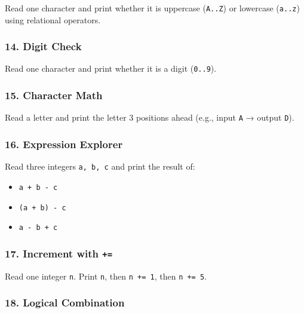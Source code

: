 \documentclass[
  letterpaper,
  DIV=11,
  numbers=noendperiod]{scrreprt}
\providecommand{\tightlist}{%
  \setlength{\itemsep}{0pt}\setlength{\parskip}{0pt}}
\begin{document}
Read one character and print whether it is uppercase
(\texttt{\textquotesingle{}A\textquotesingle{}..\textquotesingle{}Z\textquotesingle{}})
or lowercase
(\texttt{\textquotesingle{}a\textquotesingle{}..\textquotesingle{}z\textquotesingle{}})
using relational operators.

\subsubsection{14. Digit Check}\label{digit-check}

Read one character and print whether it is a digit
(\texttt{\textquotesingle{}0\textquotesingle{}..\textquotesingle{}9\textquotesingle{}}).

\subsubsection{15. Character Math}\label{character-math}

Read a letter and print the letter 3 positions ahead (e.g., input
\texttt{A} → output \texttt{D}).

\subsubsection{16. Expression Explorer}\label{expression-explorer}

Read three integers \texttt{a,\ b,\ c} and print the result of:

\begin{itemize}
\tightlist
\item
  \texttt{a\ +\ b\ -\ c}
\item
  \texttt{(a\ +\ b)\ -\ c}
\item
  \texttt{a\ -\ b\ +\ c}
\end{itemize}

\subsubsection{\texorpdfstring{17. Increment with
\texttt{+=}}{17. Increment with +=}}\label{increment-with}

Read one integer \texttt{n}. Print \texttt{n}, then \texttt{n\ +=\ 1},
then \texttt{n\ +=\ 5}.

\subsubsection{18. Logical Combination}\label{logical-combination}
\end{document}
